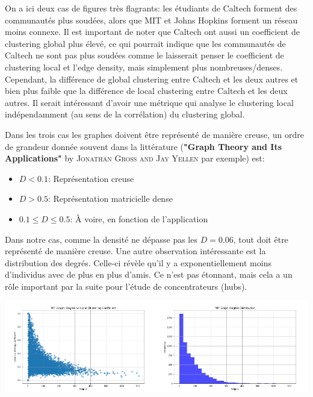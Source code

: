 \documentclass{article}
\begin{document}
On a ici deux cas de figures très flagrants: les étudiants de Caltech forment des communautés plus soudées, alors que MIT et Johns Hopkins forment un réseau moins connexe.
Il est important de noter que Caltech ont aussi un coefficient de clustering global plus élevé, ce qui pourrait indique que les communautés de Caltech ne sont pas plus soudées comme le laisserait penser le coefficient de clustering local et l'edge density, mais simplement plus nombreuses/denses.
Cependant, la différence de global clustering entre Caltech et les deux autres et bien plus faible que la différence de local clustering entre Caltech et les deux autres.
Il serait intéressant d'avoir une métrique qui analyse le clustering local indépendamment (au sens de la corrélation) du clustering global.


Dans les trois cas les graphes doivent être représenté de manière creuse, un ordre de grandeur donnée souvent dans la littérature (\textbf{"Graph Theory and Its Applications"} by \textsc{Jonathan Gross and Jay Yellen} par exemple) est:

\begin{itemize}
    \item $D < 0.1$: Représentation creuse
    \item $D > 0.5$: Représentation matricielle dense
    \item $0.1 \le D \le 0.5$: À voire, en fonction de l'application
\end{itemize}

Dans notre cas, comme la densité ne dépasse pas les $D = 0.06$, tout doit être représenté de manière creuse.
Une autre observation intéressante est la distribution des degrés. Celle-ci révèle qu'il y a exponentiellement moins d'individus avec de plus en plus d'amis.
Ce n'est pas étonnant, mais cela a un rôle important par la suite pour l'étude de concentrateurs (hubs).

\hfill\includegraphics[width=0.5\textwidth]{assets/mit_clustering.png}\includegraphics[width=0.5\textwidth]{assets/mit_deg_distrib.png}\hfill
\end{document}
